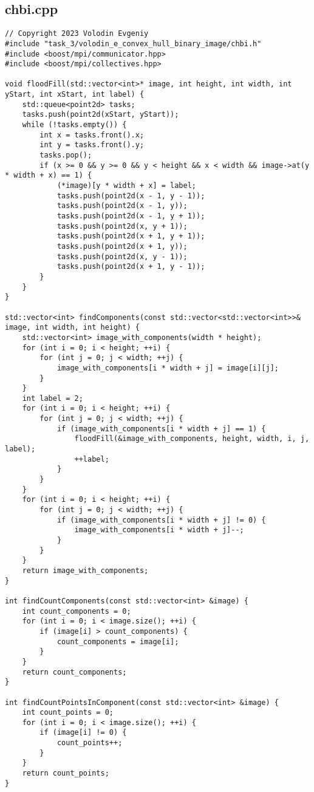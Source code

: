 \subsection*{chbi.cpp}
\begin{verbatim}
// Copyright 2023 Volodin Evgeniy
#include "task_3/volodin_e_convex_hull_binary_image/chbi.h"
#include <boost/mpi/communicator.hpp>
#include <boost/mpi/collectives.hpp>

void floodFill(std::vector<int>* image, int height, int width, int yStart, int xStart, int label) {
	std::queue<point2d> tasks;
	tasks.push(point2d(xStart, yStart));
	while (!tasks.empty()) {
		int x = tasks.front().x;
		int y = tasks.front().y;
		tasks.pop();
		if (x >= 0 && y >= 0 && y < height && x < width && image->at(y * width + x) == 1) {
			(*image)[y * width + x] = label;
			tasks.push(point2d(x - 1, y - 1));
			tasks.push(point2d(x - 1, y));
			tasks.push(point2d(x - 1, y + 1));
			tasks.push(point2d(x, y + 1));
			tasks.push(point2d(x + 1, y + 1));
			tasks.push(point2d(x + 1, y));
			tasks.push(point2d(x, y - 1));
			tasks.push(point2d(x + 1, y - 1));
		}
	}
}

std::vector<int> findComponents(const std::vector<std::vector<int>>& image, int width, int height) {
	std::vector<int> image_with_components(width * height);
	for (int i = 0; i < height; ++i) {
		for (int j = 0; j < width; ++j) {
			image_with_components[i * width + j] = image[i][j];
		}
	}
	int label = 2;
	for (int i = 0; i < height; ++i) {
		for (int j = 0; j < width; ++j) {
			if (image_with_components[i * width + j] == 1) {
				floodFill(&image_with_components, height, width, i, j, label);
				++label;
			}
		}
	}
	for (int i = 0; i < height; ++i) {
		for (int j = 0; j < width; ++j) {
			if (image_with_components[i * width + j] != 0) {
				image_with_components[i * width + j]--;
			}
		}
	}
	return image_with_components;
}

int findCountComponents(const std::vector<int> &image) {
	int count_components = 0;
	for (int i = 0; i < image.size(); ++i) {
		if (image[i] > count_components) {
			count_components = image[i];
		}
	}
	return count_components;
}

int findCountPointsInComponent(const std::vector<int> &image) {
	int count_points = 0;
	for (int i = 0; i < image.size(); ++i) {
		if (image[i] != 0) {
			count_points++;
		}
	}
	return count_points;
}


\end{verbatim}
